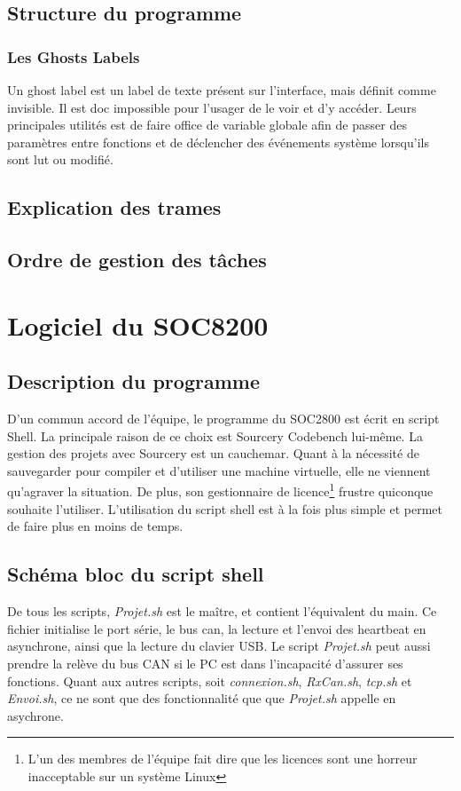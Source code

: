 \documentclass[10pt,a4paper,final]{article}
\begin{document}
\begin{spacing}{1.5}

\subsection{Structure du programme}
\subsubsection{Les Ghosts Labels}
Un ghost label est un label de texte présent sur l'interface, mais définit comme invisible. Il est doc impossible pour l'usager de le voir et d'y accéder. Leurs principales utilités est de faire office de variable globale afin de passer des paramètres entre fonctions et de déclencher des événements système lorsqu'ils sont lut ou modifié.

\subsection{Explication des trames}

\subsection{Ordre de gestion des tâches}





\pagebreak
\section{Logiciel du SOC8200}
\subsection{Description du programme}
D'un commun accord de l'équipe, le programme du SOC2800 est écrit en script Shell. La principale raison de ce choix est Sourcery Codebench lui-même. La gestion des projets avec Sourcery est un cauchemar. Quant à la nécessité de sauvegarder pour compiler et d'utiliser une machine virtuelle, elle ne viennent qu'agraver la situation. De plus, son gestionnaire de licence\footnote{L'un des membres de l'équipe fait dire que les licences sont une horreur inacceptable sur un système Linux} frustre quiconque souhaite l'utiliser. L'utilisation du script shell est à la fois plus simple et permet de faire plus en moins de temps.

\subsection{Schéma bloc du script shell}
De tous les scripts, \textit{Projet.sh} est le maître, et contient l'équivalent du main. Ce fichier initialise le port série, le bus can, la lecture et l'envoi des heartbeat en asynchrone, ainsi que la lecture du clavier USB. Le script \textit{Projet.sh} peut aussi prendre la relève du bus CAN si le PC est dans l'incapacité d'assurer ses fonctions. Quant aux autres scripts, soit \textit{connexion.sh}, \textit{RxCan.sh}, \textit{tcp.sh} et \textit{Envoi.sh}, ce ne sont que des fonctionnalité que que \textit{Projet.sh} appelle en asychrone.


\end{spacing}
\end{document}
